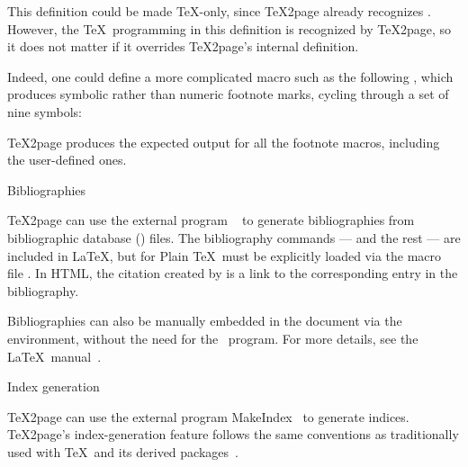 
\n This definition could be made \TeX-only, since
\TeX2page already recognizes \p{\numberedfootnote}.
However, the \TeX\ programming in this definition is
recognized by \TeX2page, so it does not matter if it
overrides \TeX2page's internal definition.

Indeed, one could define a
more complicated macro such as the following
\p{\sfootnote}, which
produces symbolic rather than
numeric footnote marks, cycling through a set of
nine symbols:


\TeX2page produces the expected output for
all the footnote macros, including the user-defined
ones.

\beginsection Bibliographies

%
\TeX2page
can use the external program \BibTeX~\cite{latex,bibtex} to
generate bibliographies from bibliographic database
() files.  The bibliography commands ---
\p{\cite} and the rest --- are included in \LaTeX, but
for Plain \TeX\ must be explicitly loaded via the macro
file .  In HTML, the citation created by
\p{\cite} is a link to the corresponding entry in the
bibliography.

Bibliographies can also be manually embedded in the
document via the  environment,
without the need for the \BibTeX\ program.  For
more details, see the \LaTeX\ manual~\cite[sec~4.3.2,
p~71]{latex}.

\beginsection Index generation

%
\TeX2page can use the external program
MakeIndex~\cite{ind,makeindex} to generate indices.
\TeX2page's index-generation feature follows the same
conventions as traditionally used with \TeX\ and its
derived packages~\cite[sec.~4.5 \& appendix~A]{latex}.

